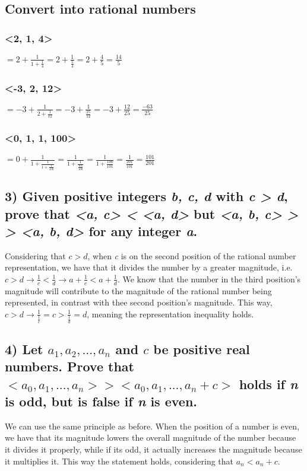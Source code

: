 \documentclass[11pt]{article}
\begin{document}
\subsection*{Convert into rational numbers}
\label{sec:org3fa806b}
\subsubsection*{<2, 1, 4>}
\label{sec:orgac5e491}
\(<2, 1, 4> = 2 + \frac{1}{1 + \frac{1}{4}} = 2 + \frac{1}{\frac{5}{4}} = 2 + \frac{4}{5} = \frac{14}{5}\)

\subsubsection*{<-3, 2, 12>}
\label{sec:org4ed64b2}
\(<-3, 2, 12> = -3 + \frac{1}{2 + \frac{1}{12}} = -3 + \frac{1}{\frac{25}{12}} = -3 + \frac{12}{25} = \frac{-63}{25}\)

\subsubsection*{<0, 1, 1, 100>}
\label{sec:orgd598c7f}
\(<0, 1, 1, 100> = 0 + \frac{1}{1 + \frac{1}{1 + \frac{1}{100}}} = \frac{1}{1 + \frac{1}{\frac{101}{100}}} = \frac{1}{1 + \frac{100}{101}} = \frac{1}{\frac{201}{101}} = \frac{101}{201}\)
\subsection*{3) Given positive integers \emph{b, c, d} with \emph{c > d}, prove that \emph{<a, c> < <a, d>} but \emph{<a, b, c> > > <a, b, d>} for any integer \emph{a}.}
\label{sec:orgedaacc7}
Considering that \(c > d\), when \emph{c} is on the second position of the rational number representation, we have that it divides the number by a greater magnitude, i.e. \(c > d \to \frac{1}{c} < \frac{1}{d} \to a + \frac{1}{c} < a + \frac{1}{d}\).
We know that the number in the third position's magnitude will contribute to the magnitude of the rational number being represented, in contrast with thee second position's magnitude. This way, \(c > d \to \frac{1}{\frac{1}{c}} = c > \frac{1}{\frac{1}{d}} = d\), meaning the representation inequality holds. 
\subsection*{4) Let \(a_1, a_2 ,...,a_n\) and \(c\) be positive real numbers. Prove that \(<a_0, a_1, ..., a_n> > <a_0, a_1, ..., a_n + c>\) holds if \emph{n} is odd, but is false if \emph{n} is even.}
\label{sec:orgd0ad5dc}
We can use the same principle as before. When the position of a number is even, we have that its magnitude lowers the overall magnitude of the number because it divides it properly, while if its odd, it actually increases the magnitude because it multiplies it. This way the statement holds, considering that \(a_n < a_n + c\).
\end{document}
